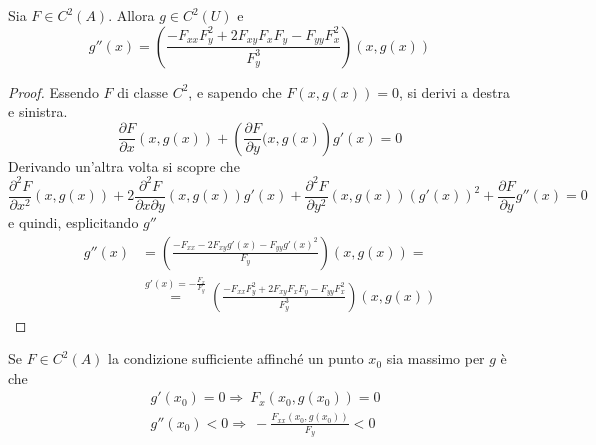 \begin{theorem}
Sia $F \in C^2(A)$. Allora $g \in C^2(U)$ e
\begin{equation*}
    g''(x)= \left(\frac{-F_{xx}F_{y}^2+2F_{xy}F_xF_y-F_{yy}F_x^2}{F_y^3}\right)(x, g(x))
\end{equation*}
\end{theorem}
\begin{proof}
Essendo $F$ di classe $C^2$, e sapendo che $F(x,g(x))=0$, si derivi a destra e sinistra.
\begin{equation*}
    \frac{\partial{F}}{\partial{x}}(x, g(x))+\left(\frac{\partial{F}}{\partial{y}}(x, g(x)\right)g'(x)=0
\end{equation*}
Derivando un'altra volta si scopre che
\begin{equation*}
    \frac{\partial^2{F}}{\partial{x^2}}(x, g(x))+ 2 \frac{\partial^2{F}}{\partial{x}\partial{y}}(x, g(x))g'(x) + \frac{\partial^2{F}}{\partial{y^2}}(x, g(x))(g'(x))^2+ \frac{\partial{F}}{\partial{y}}g''(x) =0
\end{equation*}
e quindi, esplicitando $g''$
\begin{equation*}
\begin{aligned}
    g''(x)&= \left(\frac{-F_{xx}-2F_{xy}g'(x)- F_{yy}g'(x)^2}{F_y}\right)(x, g(x))=\\
    &\overset{g'(x)=-\tfrac{F_x}{F_y}}{=} \left(\frac{-F_{xx}F_{y}^2+2F_{xy}F_xF_y-F_{yy}F_x^2}{F_y^3}\right)(x, g(x))
\end{aligned}
\end{equation*}
\end{proof}
\begin{oss}
    Se $F \in C^2(A)$ la condizione sufficiente affinché un punto $x_0$ sia massimo per $g$ è che
    \begin{equation*}
        \begin{aligned}
            &g'(x_0)=0 \Rightarrow\ F_x(x_0, g(x_0))=0\\
            &g''(x_0)<0 \Rightarrow\ -\frac{F_{xx}(x_0, g(x_0))}{F_y} < 0
        \end{aligned}
    \end{equation*}
\end{oss}
